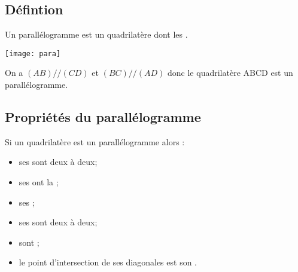 \subsection{Défintion}

\begin{mydef}
	Un parallélogramme est un quadrilatère dont les .
\end{mydef}

\begin{myex}
		
		
		\begin{center}
			\texttt{[image: para]}
		\end{center}
	
	On a $(AB) // (CD)$ et $(BC) // (AD)$ donc le quadrilatère ABCD est un parallélogramme.
\end{myex}

\subsection{Propriétés du parallélogramme}

	\begin{myprops}
		Si un quadrilatère est un parallélogramme alors :
		\begin{itemize}
			\item ses  sont  deux à deux;
			\item ses  ont la ;
			\item ses ;
			\item ses  sont  deux à deux;
			\item {} sont ;
			\item le point d'intersection de ses diagonales est son .
		\end{itemize}
	
		
	\end{myprops}


